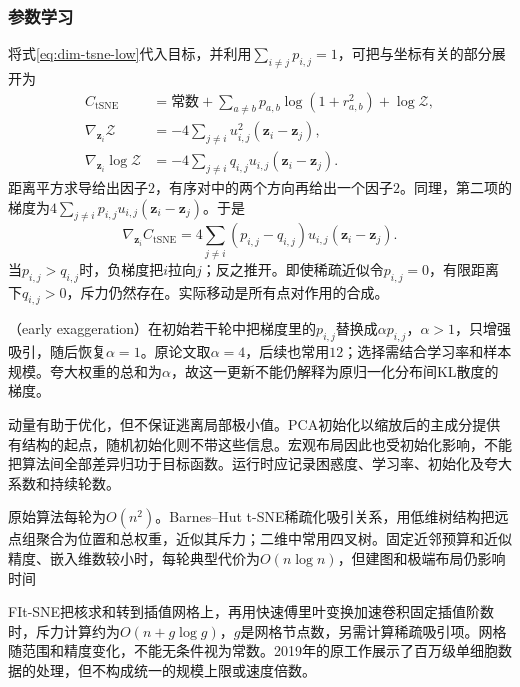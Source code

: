 \subsubsection{参数学习}

将式\eqref{eq:dim-tsne-low}代入目标，并利用$\sum_{i\ne j}p_{i,j}=1$，可把与坐标有关的部分展开为
\begin{equation}
  \label{eq:dim-tsne-gradient-derivation}
  \begin{aligned}
    C_{\mathrm{tSNE}}
      &=\text{常数}
        +\sum_{a\ne b}p_{a,b}\log(1+r_{a,b}^2)
        +\log\mathcal{Z},\\
    \nabla_{\bm{z}_i}\mathcal{Z}
      &=-4\sum_{j\ne i}u_{i,j}^2(\bm{z}_i-\bm{z}_j),\\
    \nabla_{\bm{z}_i}\log\mathcal{Z}
      &=-4\sum_{j\ne i}q_{i,j}u_{i,j}(\bm{z}_i-\bm{z}_j).
  \end{aligned}
\end{equation}
距离平方求导给出因子$2$，有序对中的两个方向再给出一个因子$2$。同理，第二项的梯度为$4\sum_{j\ne i}p_{i,j}u_{i,j}(\bm{z}_i-\bm{z}_j)$。于是
\begin{equation}
  \label{eq:dim-tsne-gradient}
  \nabla_{\bm{z}_i}C_{\mathrm{tSNE}}
    =4\sum_{j\ne i}(p_{i,j}-q_{i,j})u_{i,j}
      (\bm{z}_i-\bm{z}_j).
\end{equation}
当$p_{i,j}>q_{i,j}$时，负梯度把$i$拉向$j$；反之推开。即使稀疏近似令$p_{i,j}=0$，有限距离下$q_{i,j}>0$，斥力仍然存在。实际移动是所有点对作用的合成。

（early exaggeration）在初始若干轮中把梯度里的$p_{i,j}$替换成$\alpha p_{i,j}$，$\alpha>1$，只增强吸引，随后恢复$\alpha=1$。原论文取$\alpha=4$，后续也常用$12$；选择需结合学习率和样本规模。夸大权重的总和为$\alpha$，故这一更新不能仍解释为原归一化分布间KL散度的梯度。

动量有助于优化，但不保证逃离局部极小值。PCA初始化以缩放后的主成分提供有结构的起点，随机初始化则不带这些信息。宏观布局因此也受初始化影响，不能把算法间全部差异归功于目标函数。运行时应记录困惑度、学习率、初始化及夸大系数和持续轮数。

原始算法每轮为$O(n^2)$。Barnes--Hut t-SNE稀疏化吸引关系，用低维树结构把远点组聚合为位置和总权重，近似其斥力；二维中常用四叉树。固定近邻预算和近似精度、嵌入维数较小时，每轮典型代价为$O(n\log n)$，但建图和极端布局仍影响时间

FIt-SNE把核求和转到插值网格上，再用快速傅里叶变换加速卷积固定插值阶数时，斥力计算约为$O(n+g\log g)$，$g$是网格节点数，另需计算稀疏吸引项。网格随范围和精度变化，不能无条件视为常数。2019年的原工作展示了百万级单细胞数据的处理，但不构成统一的规模上限或速度倍数。

